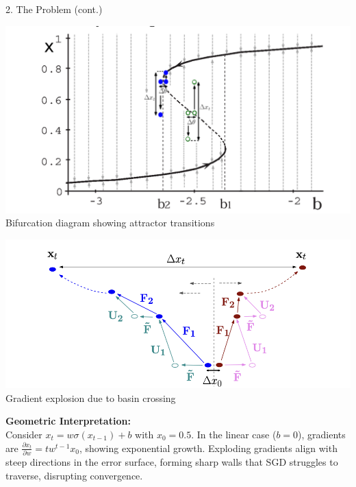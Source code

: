 \documentclass[final]{beamer}
\begin{document}
\begin{frame}[t]
\begin{columns}[t,totalwidth=\textwidth]
\begin{column}{0.3\textwidth}
\begin{block}{2. The Problem (cont.)}

    \begin{center}
        \includegraphics[width=0.9\linewidth]{figures/bifurcation.png} \\
        \small Bifurcation diagram showing attractor transitions
    \end{center}
    
    \begin{center}
        \includegraphics[width=0.9\linewidth]{figures/function_and_input.png} \\
        \small Gradient explosion due to basin crossing
    \end{center}

    \vspace{0.5em}
    \textbf{Geometric Interpretation:} \\
    Consider $x_t = w\sigma(x_{t-1}) + b$ with $x_0 = 0.5$. In the linear case ($b = 0$), gradients are $\frac{\partial x_t}{\partial w} = t w^{t-1} x_0$, showing exponential growth. Exploding gradients align with steep directions in the error surface, forming sharp walls that SGD struggles to traverse, disrupting convergence.


\end{block}
\end{column}
\end{columns}
\end{frame}
\end{document}
